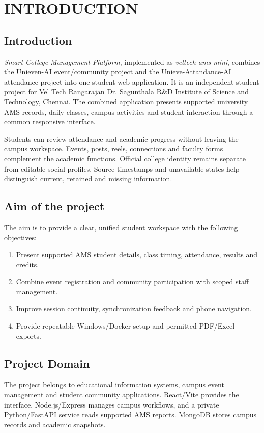 \documentclass[10pt]{report}
\newcommand{\project}{\textit{\ProjectName}}
\newcommand{\ProjectName}{Smart College Management Platform}
\begin{document}
\chapter{INTRODUCTION}
\pagestyle{plain}
\large\linespread{1.5}\selectfont
\section{Introduction}
\project, implemented as \textit{veltech-ams-mini}, combines the Unieven-AI event/community project and the Unieve-Attandance-AI attendance project into one student web application. It is an independent student project for Vel Tech Rangarajan Dr. Sagunthala R\&D Institute of Science and Technology, Chennai\cite{veltech}. The combined application presents supported university AMS records\cite{ams}, daily classes, campus activities and student interaction through a common responsive interface.

Students can review attendance and academic progress without leaving the campus workspace. Events, posts, reels, connections and faculty forms complement the academic functions. Official college identity remains separate from editable social profiles. Source timestamps and unavailable states help distinguish current, retained and missing information.

\section{Aim of the project}
The aim is to provide a clear, unified student workspace with the following objectives:
\begin{enumerate}[itemsep=1pt]
\item Present supported AMS student details, class timing, attendance, results and credits.
\item Combine event registration and community participation with scoped staff management.
\item Improve session continuity, synchronization feedback and phone navigation.
\item Provide repeatable Windows/Docker setup and permitted PDF/Excel exports.
\end{enumerate}

\section{Project Domain}
The project belongs to educational information systems\cite{education}, campus event management and student community applications. React/Vite provides the interface, Node.js/Express manages campus workflows, and a private Python/FastAPI service reads supported AMS reports. MongoDB stores campus records and academic snapshots.
\end{document}
